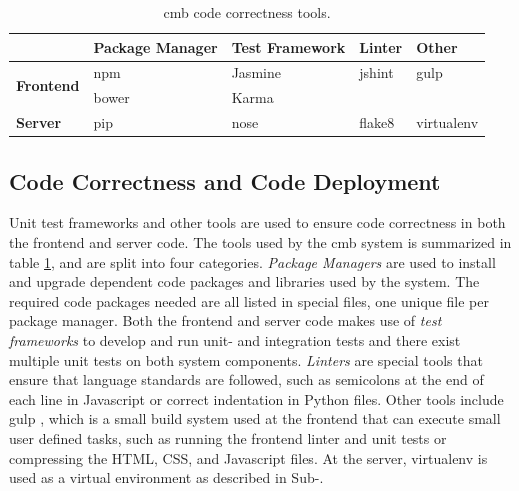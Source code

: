 \begin{table}[b!]
  \centering
  \begin{tabular}{ l|p{2.1cm}|p{2.2cm}|l|l }
    & \textbf{Package Manager} & \raggedright\textbf{Test Framework} & \textbf{Linter} & \textbf{Other} \\ \hline
  \multirow{2}{*}{\textbf{Frontend}} & npm \cite{NPM} & Jasmine \cite{JASMINE} & jshint \cite{JSHINT} & gulp \cite{GULP} \\
                                     & bower \cite{BOWER} & Karma \cite{KARMA} &  &  \\ \hline
  \multirow{1}{*}{\textbf{Server}} & pip \cite{PIP} & nose \cite{NOSE} & flake8 \cite{FLAKE8} & virtualenv \cite{VIRTUALENV}\\
  \end{tabular}
  \caption{\gls{cmb} code correctness tools.}
  \label{tab:cct}
\end{table}

\subsection{Code Correctness and Code Deployment}
\label{sec:cmb-ci}
Unit test frameworks and other tools are used to ensure code correctness in both the frontend and server code. The tools used by the \gls{cmb} system is summarized in table \ref{tab:cct}, and are split into four categories. \textit{Package Managers} are used to install and upgrade dependent code packages and libraries used by the system. The required code packages needed are all listed in special files, one unique file per package manager. Both the frontend and server code makes use of \textit{test frameworks} to develop and run unit- and integration tests and there exist multiple unit tests on both system components. \textit{Linters} are special tools that ensure that language standards are followed, such as semicolons at the end of each line in Javascript or correct indentation in Python files. Other tools include gulp \cite{GULP}, which is a small build system used at the frontend that can execute small user defined tasks, such as running the frontend linter and unit tests or compressing the HTML, CSS, and Javascript files. At the server, virtualenv \cite{VIRTUALENV} is used as a virtual environment as described in Sub-. \\

